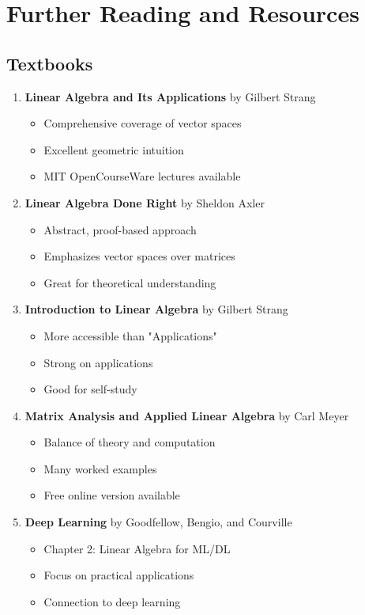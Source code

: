\documentclass[12pt,a4paper]{article}
\theoremstyle{definition}
\begin{document}
\section{Further Reading and Resources}

\subsection{Textbooks}

\begin{enumerate}
    \item \textbf{Linear Algebra and Its Applications} by Gilbert Strang
    \begin{itemize}
        \item Comprehensive coverage of vector spaces
        \item Excellent geometric intuition
        \item MIT OpenCourseWare lectures available
    \end{itemize}
    
    \item \textbf{Linear Algebra Done Right} by Sheldon Axler
    \begin{itemize}
        \item Abstract, proof-based approach
        \item Emphasizes vector spaces over matrices
        \item Great for theoretical understanding
    \end{itemize}
    
    \item \textbf{Introduction to Linear Algebra} by Gilbert Strang
    \begin{itemize}
        \item More accessible than "Applications"
        \item Strong on applications
        \item Good for self-study
    \end{itemize}
    
    \item \textbf{Matrix Analysis and Applied Linear Algebra} by Carl Meyer
    \begin{itemize}
        \item Balance of theory and computation
        \item Many worked examples
        \item Free online version available
    \end{itemize}
    
    \item \textbf{Deep Learning} by Goodfellow, Bengio, and Courville
    \begin{itemize}
        \item Chapter 2: Linear Algebra for ML/DL
        \item Focus on practical applications
        \item Connection to deep learning
    \end{itemize}
\end{enumerate}
\end{document}
